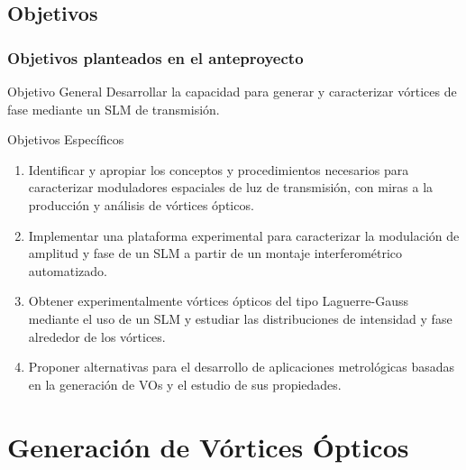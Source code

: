 \documentclass[xcolor=table,serif]{beamer}
\begin{document}
\subsection{Objetivos}
\begin{frame}
  \frametitle{Objetivos planteados en el anteproyecto}
  \begin{block}{Objetivo General}
    Desarrollar la capacidad para generar y caracterizar vórtices de fase
    mediante un SLM de transmisión. 
  \end{block}
  \begin{block}{Objetivos Espec\'ificos}
    \small
    \begin{enumerate}
	\item Identificar y apropiar los conceptos y
                  procedimientos necesarios para caracterizar
                  moduladores espaciales de luz de transmisión, con
                  miras a la producción y análisis de vórtices
                  ópticos. 
        \item Implementar una plataforma experimental para
                  caracterizar la modulación de amplitud y fase de un
                  SLM a partir de un montaje interferométrico
                  automatizado. 
         \item Obtener experimentalmente vórtices ópticos del
                  tipo Laguerre-Gauss mediante el uso de un SLM y
                  estudiar las distribuciones de intensidad y fase
                  alrededor de los vórtices. 
         \item Proponer alternativas para el desarrollo de
                  aplicaciones metrológicas basadas en la generación
                  de VOs y el estudio de sus propiedades.
       \end{enumerate}
     \end{block}
   \end{frame}

\section{Generación de Vórtices Ópticos}
\end{document}
